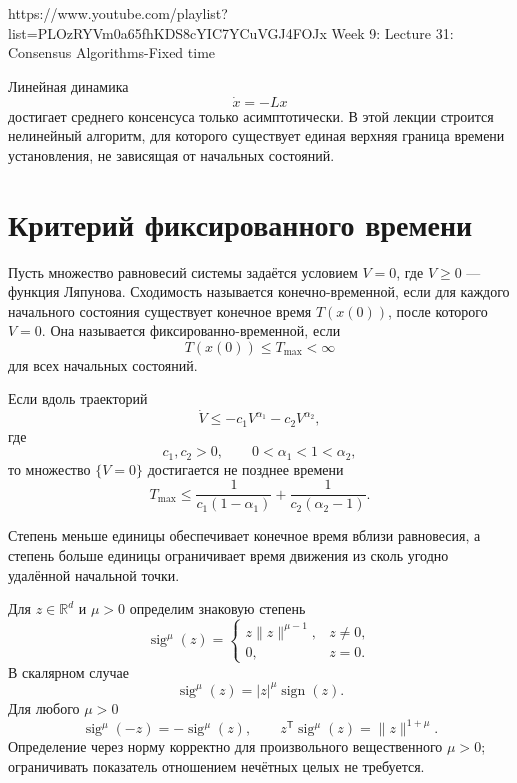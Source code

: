 
\sourcevideo
    {https://www.youtube.com/playlist?list=PLOzRYVm0a65fhKDS8cYIC7YCuVGJ4FOJx}
    {Week 9: Lecture 31: Consensus Algorithms-Fixed time}

Линейная динамика
\[
    \dot x=-Lx
\]
достигает среднего консенсуса только асимптотически. В этой лекции
строится нелинейный алгоритм, для которого существует единая верхняя
граница времени установления, не зависящая от начальных состояний.

\section{Критерий фиксированного времени}

Пусть множество равновесий системы задаётся условием \(V=0\), где
\(V\ge0\) --- функция Ляпунова. Сходимость называется
конечно-временной, если для каждого начального состояния существует
конечное время \(T(x(0))\), после которого \(V=0\). Она называется
фиксированно-временной, если
\[
    T(x(0))\le T_{\max}<\infty
\]
для всех начальных состояний.

\begin{theorem}
Если вдоль траекторий
\[
    \dot V
    \le
    -c_1V^{\alpha_1}
    -c_2V^{\alpha_2},
\]
где
\[
    c_1,c_2>0,
    \qquad
    0<\alpha_1<1<\alpha_2,
\]
то множество \(\{V=0\}\) достигается не позднее времени
\[
    T_{\max}
    \le
    \frac1{c_1(1-\alpha_1)}
    +
    \frac1{c_2(\alpha_2-1)}.
\]
\end{theorem}

Степень меньше единицы обеспечивает конечное время вблизи
равновесия, а степень больше единицы ограничивает время движения из
сколь угодно удалённой начальной точки.

Для \(z\in\mathbb R^d\) и \(\mu>0\) определим знаковую степень
\[
    \operatorname{sig}^{\mu}(z)
    =
    \begin{cases}
        z\lVert z\rVert^{\mu-1},&z\ne0,\\[1mm]
        0,&z=0.
    \end{cases}
\]
В скалярном случае
\[
    \operatorname{sig}^{\mu}(z)
    =
    |z|^\mu\operatorname{sign}(z).
\]
Для любого \(\mu>0\)
\[
    \operatorname{sig}^{\mu}(-z)
    =
    -\operatorname{sig}^{\mu}(z),
    \qquad
    z^{\mathsf T}\operatorname{sig}^{\mu}(z)
    =
    \lVert z\rVert^{1+\mu}.
\]
Определение через норму корректно для произвольного вещественного
\(\mu>0\); ограничивать показатель отношением нечётных целых не
требуется.

